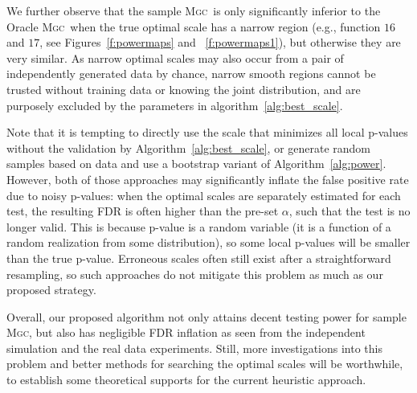 \documentclass[11pt]{article}
\providecommand{\sct}[1]{{\normalfont\textsc{#1}}}
\newcommand{\Mgc}{\sct{Mgc}}
\begin{document}
We further observe that the sample \Mgc~is only significantly inferior to the Oracle \Mgc~when the true optimal scale has a narrow region (e.g., function $16$ and $17$, see Figures~\ref{f:powermaps} and ~\ref{f:powermaps1}), but otherwise they are very similar. As narrow optimal scales may also occur from a pair of independently generated data by chance, narrow smooth regions cannot be trusted without training data or knowing the joint distribution, and are purposely excluded by the parameters in algorithm~\ref{alg:best_scale}.

Note that it is tempting to directly use the scale that minimizes all local p-values without the validation by Algorithm~\ref{alg:best_scale}, or generate random samples based on  data  and use a bootstrap variant of Algorithm~\ref{alg:power}. However, both of those approaches may significantly inflate the false positive rate due to noisy p-values: when the optimal scales are separately estimated for each test, the resulting FDR is often higher than the pre-set $\alpha$, such that the test is no longer valid. This is because p-value is a random variable (it is a function of a random realization from some distribution), so some local p-values will be smaller than the true p-value. Erroneous scales often still exist after a straightforward resampling, so such approaches do not mitigate this problem as much as our proposed strategy. 

Overall, our proposed algorithm not only attains decent testing power for sample \Mgc, but also has negligible FDR inflation as seen from the independent simulation and the real data experiments.
Still, more investigations into this problem and better methods for searching the optimal scales will be worthwhile, to establish some theoretical supports for the current heuristic approach.

\end{document}
